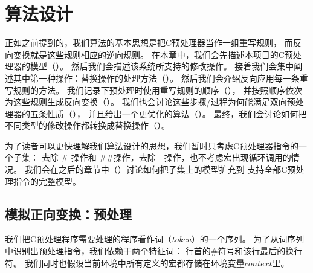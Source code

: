 \chapter{算法设计}
\label{sec:approach}
正如之前提到的，我们算法的基本思想是把C预处理器当作一组重写规则，
而反向变换就是这些规则相应的逆向规则。
在本章中，我们会先描述本项目的C预处理器的模型（）。
然后我们会描述该系统所支持的修改操作。
接着我们会集中阐述其中第一种操作：替换操作的处理方法（）。
然后我们会介绍反向应用每一条重写规则的方法。
我们记录下预处理时使用重写规则的顺序（），
并按照顺序依次为这些规则生成反向变换（）。
我们也会讨论这些步骤/过程为何能满足双向预处理器的五条性质（），
并且给出一个更优化的算法（）。
最终，我们会讨论如何把不同类型的修改操作都转换成替换操作（）。



为了读者可以更快理解我们算法设计的思想，我们暂时只考虑C预处理器指令的一个子集：
去除 \# 操作和 \#\#操作，去除~~操作，也不考虑宏出现循环调用的情况。
我们会在之后的章节中（）讨论如何把子集上的模型扩充到
支持全部C预处理指令的完整模型。

\newcommand{\dstart}{\ensuremath{\langle\#}\xspace}
\newcommand{\dend}{\ensuremath{\rangle}\xspace}

\section{模拟正向变换：预处理}\label{sec:forward}
我们把C预处理程序需要处理的程序看作词（\emph{token}）的一个序列。
为了从词序列中识别出预处理指令，我们依赖于两个特征词：
行首的\#符号和该行最后的换行符。
我们同时也假设当前环境中所有定义的宏都存储在环境变量\emph{$context$}里。

